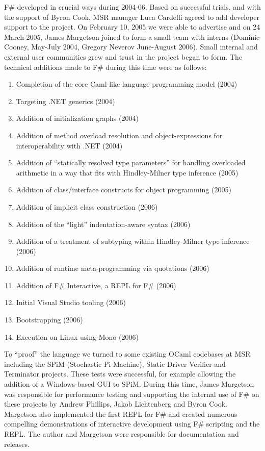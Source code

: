 \documentclass[acmsmall,review]{acmart}\settopmatter{printfolios=true,printccs=false,printacmref=false}
\begin{document}
F\# developed in crucial ways during 2004-06.  Based on successful trials, and with the support of Byron Cook, MSR manager Luca Cardelli agreed to add developer support to the project. On February 10, 2005 we were able to advertise and on 24 March 2005, James Margetson joined to form a small team with interns (Dominic Cooney, May-July 2004, Gregory Neverov June-August 2006). Small internal and external user communities grew and trust in the project began to form. The technical additions made to F\# during this time were as follows:

\begin{enumerate}
\item Completion of the core Caml-like language programming model (2004)
\item Targeting .NET generics (2004)
\item Addition of initialization graphs (2004)
\item Addition of method overload resolution and object-expressions for interoperability with .NET (2004)
\item Addition of “statically resolved type parameters” for handling overloaded arithmetic in a way that fits with Hindley-Milner type inference (2005)
\item Addition of class/interface constructs for object programming (2005)
\item Addition of implicit class construction (2006)
\item Addition of the “light” indentation-aware syntax (2006)
\item Addition of a treatment of subtyping within Hindley-Milner type inference (2006)
\item Addition of runtime meta-programming via quotations (2006)
\item Addition of F\# Interactive, a REPL for F\# (2006)
\item Initial Visual Studio tooling (2006)
\item Bootstrapping (2006)
\item Execution on Linux using Mono (2006)
\end{enumerate}

To “proof” the language we turned to some existing OCaml codebases at MSR including the SPiM (Stochastic Pi Machine), Static Driver Verifier and Terminator projects.  These tests were successful, for example allowing the addition of a Windows-based GUI to SPiM.   During this time, James Margetson was responsible for performance testing and supporting the internal use of F\# on these projects by Andrew Phillips, Jakob Lichtenberg and Byron Cook. Margetson also implemented the first REPL for F\# and created numerous compelling demonstrations of interactive development using F\# scripting and the REPL. The author and Margetson were responsible for documentation and releases.
\end{document}

